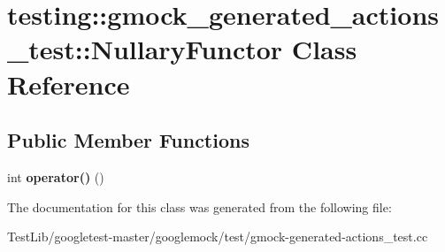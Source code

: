 \hypertarget{classtesting_1_1gmock__generated__actions__test_1_1NullaryFunctor}{}\section{testing\+:\+:gmock\+\_\+generated\+\_\+actions\+\_\+test\+:\+:Nullary\+Functor Class Reference}
\label{classtesting_1_1gmock__generated__actions__test_1_1NullaryFunctor}
\subsection*{Public Member Functions}
\begin{DoxyCompactItemize}
\item 
\mbox{\label{classtesting_1_1gmock__generated__actions__test_1_1NullaryFunctor_afcf5ace9bbb5a2a91482688bdc20fa07}} 
int {\bfseries operator()} ()
\end{DoxyCompactItemize}


The documentation for this class was generated from the following file\+:\begin{DoxyCompactItemize}
\item 
Test\+Lib/googletest-\/master/googlemock/test/gmock-\/generated-\/actions\+\_\+test.\+cc\end{DoxyCompactItemize}
